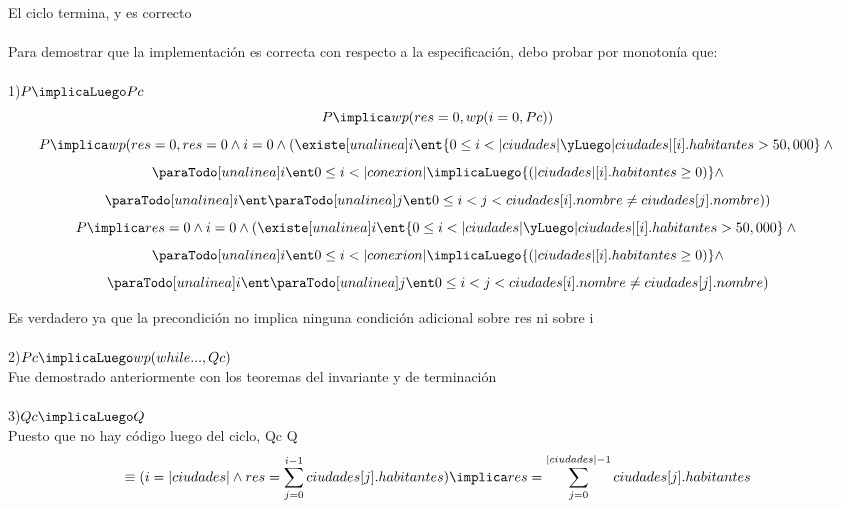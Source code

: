 \documentclass[10pt,a4paper]{article}
\begin{document}
El ciclo termina, y es correcto \\
\\
Para demostrar que la implementación es correcta con respecto a la especificación, debo probar por monotonía que:\\ \\
1)$ P\implicaLuego Pc$\\ \hspace{0.5cm}
\[P \implica wp(res=0, wp(i=0, Pc))\]
\[P \implica wp(res=0, res = 0 \land i = 0 \land (\existe[unalinea]i\ent {0\leq i<|ciudades| \yLuego |ciudades|[i].habitantes > 50,000} \land \\\]
\[  \paraTodo[unalinea]i{\ent}{0 \leq i<|conexion|} \implicaLuego {(|ciudades|[i].habitantes \geq 0) } \land \]
   \[ \paraTodo[unalinea]i{\ent}{\paraTodo[unalinea]j{\ent}{0 \leq i < j<ciudades[i].nombre \neq ciudades[j].nombre}}))\]
\[P \implica res = 0 \land i = 0 \land (\existe[unalinea]i\ent {0\leq i<|ciudades| \yLuego |ciudades|[i].habitantes > 50,000} \land \\ \]
\[ \paraTodo[unalinea]i{\ent}{0 \leq i<|conexion|} \implicaLuego {(|ciudades|[i].habitantes \geq 0) } \land \]
 \[   \paraTodo[unalinea]i{\ent}{\paraTodo[unalinea]j{\ent}{0 \leq i < j<ciudades[i].nombre \neq ciudades[j].nombre}})\]

Es verdadero ya que la precondición no implica ninguna condición adicional sobre res ni sobre i\\ \\
2)$Pc \implicaLuego wp(while..., Qc)$ \\ \hspace{0.5cm}
Fue demostrado anteriormente con los teoremas del invariante y de terminación \\ \\
3)$ Qc \implicaLuego Q$\\ \hspace{0.5cm}
Puesto que no hay código luego del ciclo, Qc \implica Q
\[\equiv (i=|ciudades| \land res ={\sum\limits_{j=0}^{i-1}ciudades[j].habitantes})\implica res = {\sum\limits_{j=0}^{|ciudades|-1}ciudades[j].habitantes}\\\]
\end{document}

